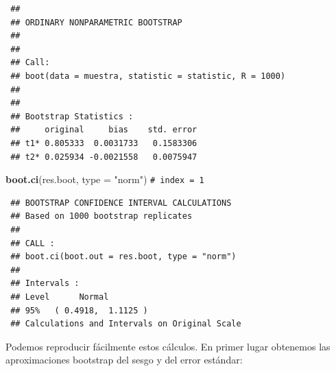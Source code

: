 \documentclass[
  spanish,
  10pt,
]{book}
\newenvironment{Shaded}{\begin{snugshade}}{\end{snugshade}}
\newcommand{\AttributeTok}[1]{\textcolor[rgb]{0.13,0.29,0.53}{#1}}
\newcommand{\CommentTok}[1]{\textcolor[rgb]{0.56,0.35,0.01}{\textit{#1}}}
\newcommand{\ConstantTok}[1]{\textcolor[rgb]{0.56,0.35,0.01}{#1}}
\newcommand{\DecValTok}[1]{\textcolor[rgb]{0.00,0.00,0.81}{#1}}
\newcommand{\FunctionTok}[1]{\textcolor[rgb]{0.13,0.29,0.53}{\textbf{#1}}}
\newcommand{\NormalTok}[1]{#1}
\newcommand{\OtherTok}[1]{\textcolor[rgb]{0.56,0.35,0.01}{#1}}
\newcommand{\SpecialCharTok}[1]{\textcolor[rgb]{0.81,0.36,0.00}{\textbf{#1}}}
\newcommand{\StringTok}[1]{\textcolor[rgb]{0.31,0.60,0.02}{#1}}
\theoremstyle{break}
\theoremstyle{nonumberplain}
\renewcommand{\CommentTok}[1]{\textcolor[rgb]{0.41,0.41,0.41}{\texttt{#1}}}
\begin{document}
\begin{verbatim}
 ## 
 ## ORDINARY NONPARAMETRIC BOOTSTRAP
 ## 
 ## 
 ## Call:
 ## boot(data = muestra, statistic = statistic, R = 1000)
 ## 
 ## 
 ## Bootstrap Statistics :
 ##     original     bias    std. error
 ## t1* 0.805333  0.0031733   0.1583306
 ## t2* 0.025934 -0.0021558   0.0075947
\end{verbatim}

\begin{Shaded}
\begin{Highlighting}[]
\FunctionTok{boot.ci}\NormalTok{(res.boot, }\AttributeTok{type =} \StringTok{"norm"}\NormalTok{) }\CommentTok{\# index = 1}
\end{Highlighting}
\end{Shaded}

\begin{verbatim}
 ## BOOTSTRAP CONFIDENCE INTERVAL CALCULATIONS
 ## Based on 1000 bootstrap replicates
 ## 
 ## CALL : 
 ## boot.ci(boot.out = res.boot, type = "norm")
 ## 
 ## Intervals : 
 ## Level      Normal        
 ## 95%   ( 0.4918,  1.1125 )  
 ## Calculations and Intervals on Original Scale
\end{verbatim}

Podemos reproducir fácilmente estos cálculos.
En primer lugar obtenemos las aproximaciones bootstrap del sesgo y del error estándar:

\begin{Shaded}
\end{Shaded}
\end{document}
